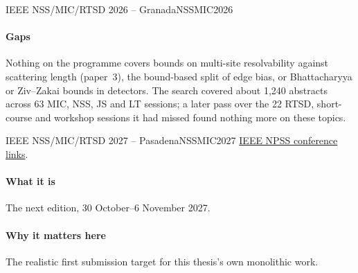 \begin{confnote}{IEEE NSS/MIC/RTSD 2026 -- Granada}{NSSMIC2026}
\paragraph{Gaps}
Nothing on the programme covers bounds on multi-site resolvability against scattering length (paper~3), the bound-based split of edge bias, or Bhattacharyya or Ziv--Zakai bounds in detectors.
The search covered about 1,240 abstracts across 63 MIC, NSS, JS and LT sessions; a later pass over the 22 RTSD, short-course and workshop sessions it had missed found nothing more on these topics.
\end{confnote}
 
\begin{confnote}{IEEE NSS/MIC/RTSD 2027 -- Pasadena}{NSSMIC2027}
\href{https://ieee-npss.org/nss-mic-conference-links/}{IEEE NPSS conference links}.

\paragraph{What it is}
The next edition, 30 October--6 November 2027.

\paragraph{Why it matters here}
The realistic first submission target for this thesis's own monolithic work.
\end{confnote}
 
 
